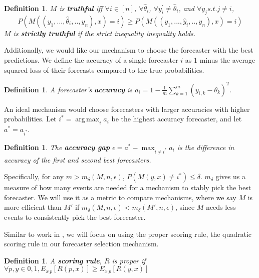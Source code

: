 \documentclass[letterpaper,12pt]{article}
\DeclareMathOperator*{\argmax}{arg\,max}
\newcommand{\1}{\mathbbm{1}}
\newtheorem{definition}[theorem]{Definition}
\begin{document}
\begin{definition}
  \label{truthfullness}
  $M$ is \textbf{truthful} iff $\forall i \in [n]$, $\forall \hat{\theta}_i$, $\forall y^{\prime}_i \neq \hat{\theta}_i$, and $\forall y_j s.t. j \neq i$,
\[ P(M( (y_1, ..., \hat \theta_i, .., y_n), x ) = i) \geq  P(M( (y_1, ..., \hat y_i, .., y_n), x ) = i)\]
$M$ is \textbf{strictly truthful} if the strict inequality inequality holds.
\end{definition}

Additionally, we would like our mechanism to choose the forecaster with the best predictions. We define the accuracy of a single forecaster $i$ as 1 minus the average squared loss of their forecasts compared to the true probabilities.

\begin{definition}
  \label{accuracy}
  A forecaster's \textbf{accuracy} is $a_i = 1 - \frac{1}{m}\sum_{k=1}^m (y_{i, k} - \theta_k)^2$.
\end{definition}
An ideal mechanism would choose forecasters with larger accuracies with higher probabilities. Let $i^* = \argmax_i a_i$ be the highest accuracy forecaster, and let $a^* = a_{i^*}$.

\begin{definition}
  \label{accuracy_gap}
  The \textbf{accuracy gap} $\epsilon = a^* - \max_{i \neq i^*} a_i$ is the difference in accuracy of the first and second best forecasters.
\end{definition}

Specifically, for any $m > m_\delta(M, n, \epsilon)$, $P(M(y, x) \neq i^*) \leq \delta$. $m_\delta$ gives us a measure of how many events are needed for a mechanism to stably pick the best forecaster. We will use it as a metric to compare mechanisms, where we say $M$ is more efficient than $M'$ if $m_\delta(M, n, \epsilon) < m_\delta(M', n, \epsilon)$, since $M$ needs less events to consistently pick the best forecaster.

Similar to work in \cite{elf}, we will focus on using the proper scoring rule, the quadratic scoring rule in our forecaster selection mechanism.

\begin{definition}
  \label{scoring_rule}
  A \textbf{scoring rule}, $R$ is proper if $\forall p,y \in {0,1}, E_{x~p}[R(p,x)] \ge E_{x~p}[R(y,x)]$
\end{definition}
\end{document}
